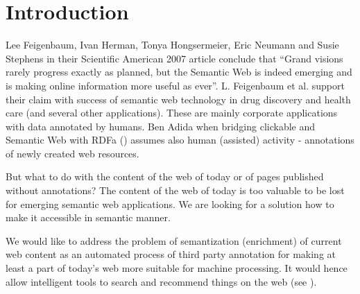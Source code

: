 \documentclass{www2009-submission}
\begin{document}


\section{Introduction}



Lee Feigenbaum, Ivan Herman, Tonya Hongsermeier, Eric Neumann and Susie Stephens in their Scientific American 2007 article \cite{biblio:feigenbaum_semantic_2007} conclude that ``Grand visions rarely progress exactly as planned, but the Semantic Web is indeed emerging and is making online information more useful as ever''. L. Feigenbaum et al. support their claim with success of semantic web technology in drug discovery and health care (and several other applications). These are mainly corporate applications with data annotated by humans. Ben Adida when bridging clickable and Semantic Web with RDFa (\cite{biblio:AdidaClickable}) assumes also human (assisted) activity - annotations of newly created web resources. \par

But what to do with the content of the web of today or of pages published without annotations? The content of the web of today is too valuable to be lost for emerging semantic web applications. We are looking for a solution how to make it accessible in semantic manner. \par

We would like to address the problem of semantization (enrichment) of current web content as an automated process of third party annotation for making at least a part of today's web more suitable for machine processing. It would hence allow intelligent tools to search and recommend things on the web (see \cite{biblio:LeeWebThings}). \par
\end{document}

